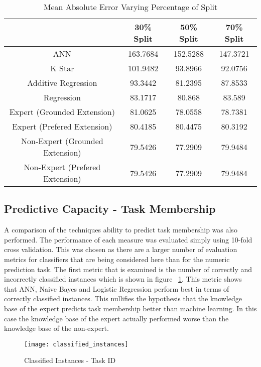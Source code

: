 \begin{table}[!htbp]
\centering
\begin{tabular}{|c|c|c|c|}
\hline
                                & 30\% Split  & 50\% Split  & 70\% Split \\ \hline
ANN                             & 163.7684 & 152.5288 & 147.3721 \\
K Star                          & 101.9482 & 93.8966 & 92.0756 \\
Additive Regression             & 93.3442  & 81.2395  & 87.8533 \\
Regression                      & 83.1717 & 80.868 & 83.589 \\
Expert (Grounded Extension)     & 81.0625 & 78.0558 & 78.7381 \\
Expert (Prefered Extension)     & 80.4185 & 80.4475 &  80.3192 \\
Non-Expert (Grounded Extension) & 79.5426 & 77.2909 & 79.9484 \\
Non-Expert (Prefered Extension) & 79.5426 & 77.2909 & 79.9484 \\
\hline
\end{tabular}
\caption{Mean Absolute Error Varying Percentage of Split}
\label{tab:time_predictions_split}
\end{table}

\subsection{Predictive Capacity - Task Membership}

A comparison of the techniques ability to predict task membership was also performed. The performance of each measure was evaluated simply using 10-fold cross validation. This was chosen as there are a larger number of evaluation metrics for classifiers that are being considered here than for the numeric prediction task. The first metric that is examined is the number of correctly and incorrectly classified instances which is shown in figure ~\ref{fig:classified}. This metric shows that ANN, Naive Bayes and Logistic Regression perform best in terms of correctly classified instances. This nullifies the hypothesis that the knowledge base of the expert predicts task membership better than machine learning. In this case the knowledge base of the expert actually performed worse than the knowledge base of the non-expert.

\begin{figure}[!h]
\centering
\texttt{[image: classified\_instances]}
\caption{Classified Instances - Task ID}
\label{fig:classified}
\end{figure}

